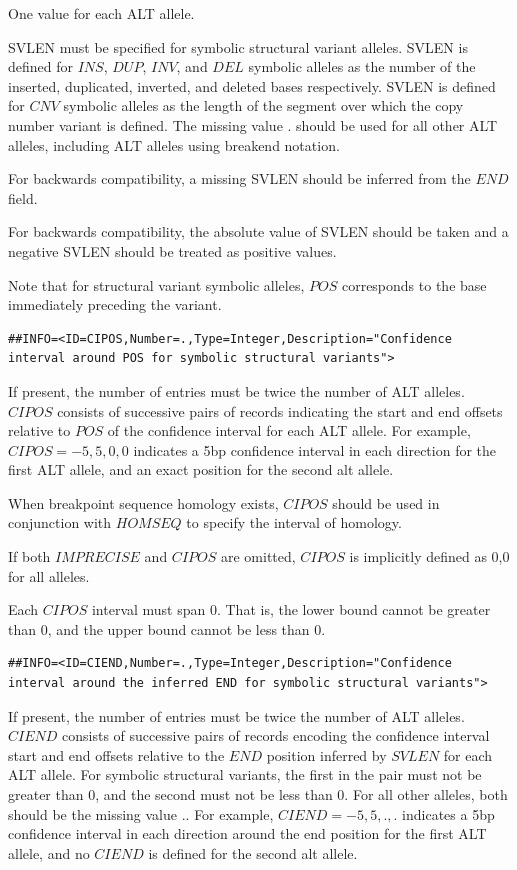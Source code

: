 \documentclass[8pt]{article}
\begin{document}
One value for each ALT allele.

SVLEN must be specified for symbolic structural variant alleles.
SVLEN is defined for $INS$, $DUP$, $INV$, and $DEL$ symbolic alleles as the number of the inserted, duplicated, inverted, and deleted bases respectively.
SVLEN is defined for $CNV$ symbolic alleles as the length of the segment over which the copy number variant is defined.
The missing value $.$ should be used for all other ALT alleles, including ALT alleles using breakend notation.

For backwards compatibility, a missing SVLEN should be inferred from the $END$ field.

For backwards compatibility, the absolute value of SVLEN should be taken and a negative SVLEN should be treated as positive values.

Note that for structural variant symbolic alleles, $POS$ corresponds to the base immediately preceding the variant.

\footnotesize
\begin{verbatim}
##INFO=<ID=CIPOS,Number=.,Type=Integer,Description="Confidence interval around POS for symbolic structural variants">
\end{verbatim}
\normalsize

If present, the number of entries must be twice the number of ALT alleles.
$CIPOS$ consists of successive pairs of records indicating the start and end offsets relative to $POS$ of the confidence interval for each ALT allele.
For example, $CIPOS=-5,5,0,0$ indicates a 5bp confidence interval in each direction for the first ALT allele, and an exact position for the second alt allele.

When breakpoint sequence homology exists, $CIPOS$ should be used in conjunction with $HOMSEQ$ to specify the interval of homology.

If both $IMPRECISE$ and $CIPOS$ are omitted, $CIPOS$ is implicitly defined as 0,0 for all alleles.

Each $CIPOS$ interval must span 0. That is, the lower bound cannot be greater than 0, and the upper bound cannot be less than 0.

\footnotesize
\begin{verbatim}
##INFO=<ID=CIEND,Number=.,Type=Integer,Description="Confidence interval around the inferred END for symbolic structural variants">
\end{verbatim}
\normalsize

If present, the number of entries must be twice the number of ALT alleles.
$CIEND$ consists of successive pairs of records encoding the confidence interval start and end offsets relative to the $END$ position inferred by $SVLEN$ for each ALT allele.
For symbolic structural variants, the first in the pair must not be greater than 0, and the second must not be less than 0.
For all other alleles, both should be the missing value $.$.
For example, $CIEND=-5,5,.,.$ indicates a 5bp confidence interval in each direction around the end position for the first ALT allele, and no $CIEND$ is defined for the second alt allele.
\end{document}
